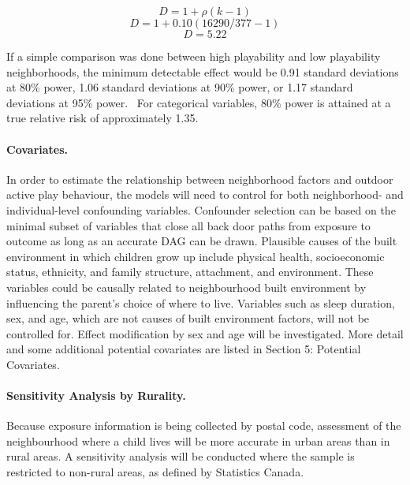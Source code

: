 \documentclass [11pt]{article}
\begin{document}
\begin{equation}\nonumber
D = 1 + \rho (k - 1)
\end{equation}
\begin{equation}\nonumber
D = 1 + 0.10 (16290/377 - 1)
\end{equation}
\begin{equation}\nonumber
D = 5.22
\end{equation}

If a simple comparison was done between high playability and low playability neighborhoods, the minimum detectable effect would be 0.91 standard deviations at 80\% power, 1.06 standard deviations at 90\% power, or 1.17 standard deviations at 95\% power.~\cite{Galecki2009-jt} For categorical variables, 80\% power is attained at a true relative risk of approximately 1.35. 

\paragraph{Covariates.}

In order to estimate the relationship between neighborhood factors and outdoor active play behaviour, the models will need to control for both neighborhood- and individual-level confounding variables. Confounder selection can be based on the minimal subset of variables that close all back door paths from exposure to outcome as long as an accurate DAG can be drawn. \cite{VanderWeele2011-xu} Plausible causes of the built environment in which children grow up include physical health, socioeconomic status, ethnicity, and family structure, attachment, and environment. These variables could be causally related to neighbourhood built environment by influencing the parent's choice of where to live. Variables such as sleep duration, sex, and age, which are not causes of built environment factors, will not be controlled for. Effect modification by sex and age will be investigated. More detail and some additional potential covariates are listed in Section 5: Potential Covariates. 

\paragraph{Sensitivity Analysis by Rurality.}

Because exposure information is being collected by postal code, assessment of the neighbourhood where a child lives will be more accurate in urban areas than in rural areas. A sensitivity analysis will be conducted where the sample is restricted to non-rural areas, as defined by Statistics Canada. \cite{Government_of_Canada_Statistics_Canada2011-ee}
\end{document}
